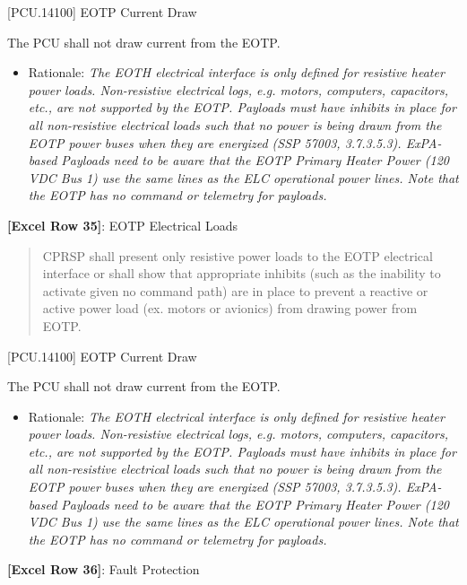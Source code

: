 [PCU.14100] EOTP Current Draw

The PCU shall not draw current from the EOTP.

\begin{itemize}
\item{} Rationale: \emph{The EOTH electrical interface is only defined for resistive heater power loads. Non-resistive electrical logs, \emph{e.g.} motors, computers, capacitors, \emph{etc.}, are not supported by the EOTP. Payloads must have inhibits in place for all non-resistive electrical loads such that no power is being drawn from the EOTP power buses when they are energized (SSP 57003, 3.7.3.5.3). ExPA-based Payloads need to be aware that the EOTP Primary Heater Power (120 VDC Bus 1) use the same lines as the ELC operational power lines. Note that the EOTP has no command or telemetry for payloads.}

\end{itemize}

\textbf{[Excel Row 35]}: EOTP Electrical Loads

\begin{quote}
CPRSP shall present only resistive power loads to the EOTP electrical interface or shall show that appropriate inhibits (such as the inability to activate given no command path) are in place to prevent a reactive or active power load (ex. motors or avionics) from drawing power from EOTP.
\end{quote}

[PCU.14100] EOTP Current Draw

The PCU shall not draw current from the EOTP.

\begin{itemize}
\item{} Rationale: \emph{The EOTH electrical interface is only defined for resistive heater power loads. Non-resistive electrical logs, \emph{e.g.} motors, computers, capacitors, \emph{etc.}, are not supported by the EOTP. Payloads must have inhibits in place for all non-resistive electrical loads such that no power is being drawn from the EOTP power buses when they are energized (SSP 57003, 3.7.3.5.3). ExPA-based Payloads need to be aware that the EOTP Primary Heater Power (120 VDC Bus 1) use the same lines as the ELC operational power lines. Note that the EOTP has no command or telemetry for payloads.}

\end{itemize}

\textbf{[Excel Row 36]}: Fault Protection

